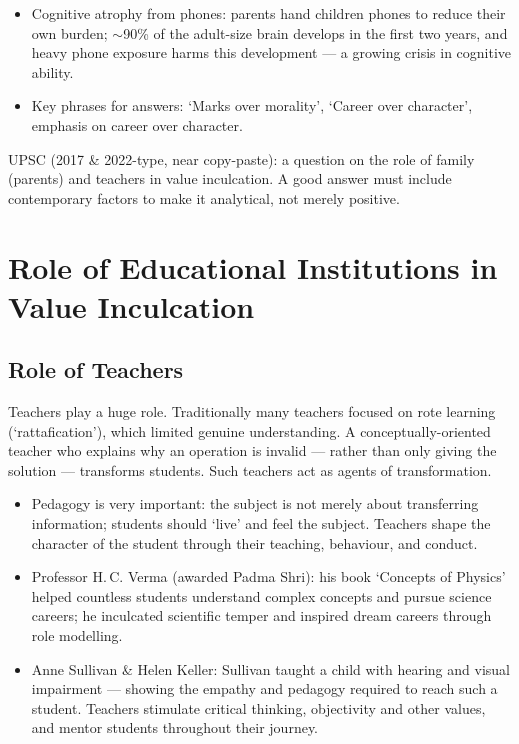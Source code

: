 \begin{CriticalPoint}
\begin{itemize}
\item Cognitive atrophy from phones: parents hand children phones to reduce their own burden; $\sim$90\% of the adult-size brain develops in the first two years, and heavy phone exposure harms this development --- a growing crisis in cognitive ability.
\item Key phrases for answers: `Marks over morality', `Career over character', emphasis on career over character.
\end{itemize}
\end{CriticalPoint}

\begin{PYQLink}
UPSC (2017 \& 2022-type, near copy-paste): a question on the role of family (parents) and teachers in value inculcation. A good answer must include contemporary factors to make it analytical, not merely positive.
\end{PYQLink}

\section{Role of Educational Institutions in Value Inculcation}

\subsection{Role of Teachers}

Teachers play a huge role. Traditionally many teachers focused on rote learning (`rattafication'), which limited genuine understanding. A conceptually-oriented teacher who explains why an operation is invalid --- rather than only giving the solution --- transforms students. Such teachers act as agents of transformation.

\begin{itemize}
\item Pedagogy is very important: the subject is not merely about transferring information; students should `live' and feel the subject. Teachers shape the character of the student through their teaching, behaviour, and conduct.
\item Professor H.\,C. Verma (awarded Padma Shri): his book `Concepts of Physics' helped countless students understand complex concepts and pursue science careers; he inculcated scientific temper and inspired dream careers through role modelling.
\item Anne Sullivan \& Helen Keller: Sullivan taught a child with hearing and visual impairment --- showing the empathy and pedagogy required to reach such a student. Teachers stimulate critical thinking, objectivity and other values, and mentor students throughout their journey.
\end{itemize}

